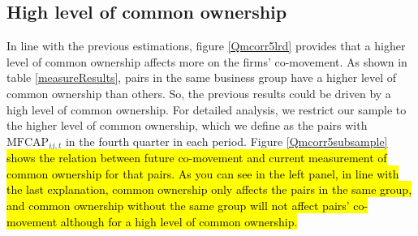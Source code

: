 %			
%			


		\FloatBarrier
		
		
		
		\subsection{{High level of common ownership}}
		
			In line with the previous estimations, figure \ref{Qmcorr5lrd} provides that a higher level of common ownership affects more on the firms' co-movement. As shown in table \ref{measureResults}, pairs in the same business group have a higher level of common ownership than others. So, the previous results could be driven by a high level of common ownership. For detailed analysis, we restrict our sample to the higher level of common ownership, which we define as the pairs with $\text{MFCAP}_{ij,t}$ in the fourth quarter in each period. Figure \ref{Qmcorr5subsample} \hl{shows the relation between future co-movement and current measurement of common ownership for that pairs. As you can see in the left panel, in line with the last explanation, common ownership only affects the pairs in the same group, and common ownership without the same group will not affect pairs' co-movement although for a high level of common ownership.}
			
